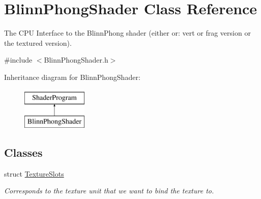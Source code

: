 \hypertarget{class_blinn_phong_shader}{}\section{Blinn\+Phong\+Shader Class Reference}
\label{class_blinn_phong_shader}


The C\+PU Interface to the Blinn\+Phong shader (either or\+: vert or frag version or the textured version).




{\ttfamily \#include $<$Blinn\+Phong\+Shader.\+h$>$}

Inheritance diagram for Blinn\+Phong\+Shader\+:\begin{figure}[H]
\begin{center}
\leavevmode
\includegraphics[height=2.000000cm]{class_blinn_phong_shader}
\end{center}
\end{figure}
\subsection*{Classes}
\begin{DoxyCompactItemize}
\item
struct \hyperlink{struct_blinn_phong_shader_1_1_texture_slots}{Texture\+Slots}
\begin{DoxyCompactList}\small\item\em Corresponds to the texture unit that we want to bind the texture to. \end{DoxyCompactList}\end{DoxyCompactItemize}
